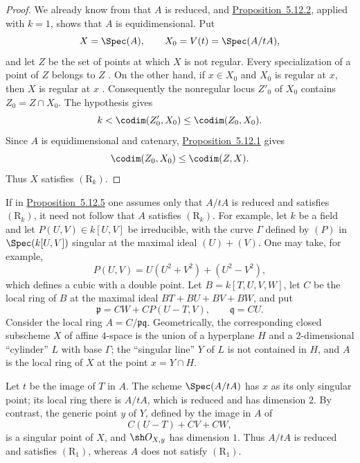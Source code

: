 \begin{proof}
We already know from  that $A$ is reduced, and
{\hyperlink{ega4.c04.prop.5-12-2}{Proposition~5.12.2}}, applied with $k=1$, shows that $A$ is
equidimensional.  Put
\[
  X=\Spec(A),\qquad X_0=V(t)=\Spec(A/tA),
\]
and let $Z$ be the set of points at which $X$ is not regular.
Every specialization of a point of $Z$ belongs to $Z$
.  On the other hand, if $x\in X_0$ and $X_0$
is regular at $x$, then $X$ is regular at $x$
.  Consequently the nonregular locus $Z'_0$
of $X_0$ contains $Z_0=Z\cap X_0$.  The hypothesis gives
\[
  k<\codim(Z'_0,X_0)\leq\codim(Z_0,X_0).
\]
Since $A$ is equidimensional and catenary, {\hyperlink{ega4.c04.prop.5-12-1}{Proposition~5.12.1}}
gives
\[
  \codim(Z_0,X_0)\leq\codim(Z,X).
\]
Thus $X$ satisfies $(\mathrm R_k)$.
\end{proof}

\begin{remark}[5.12.6]
\label{IV.5.12.6}
If in {\hyperlink{ega4.c04.prop.5-12-5}{Proposition~5.12.5}} one assumes only that $A/tA$ is reduced
and satisfies $(\mathrm R_k)$, it need not follow that $A$
satisfies $(\mathrm R_k)$.  For example, let $k$ be a field and
let $P(U,V)\in k[U,V]$ be irreducible, with the curve $\Gamma$
defined by $(P)$ in $\Spec(k[U,V])$ singular at the maximal ideal
$(U)+(V)$.  One may take, for example,
\[
  P(U,V)=U(U^2+V^2)+(U^2-V^2),
\]
which defines a cubic with a double point.  Let
$B=k[T,U,V,W]$, let $C$ be the local ring of $B$ at the maximal
ideal $BT+BU+BV+BW$, and put
\[
  \mathfrak p=CW+CP(U-T,V),\qquad \mathfrak q=CU.
\]
Consider the local ring $A=C/\mathfrak p\mathfrak q$.
Geometrically, the corresponding closed subscheme $X$ of affine
$4$-space is the union of a hyperplane $H$ and a
$2$-dimensional ``cylinder'' $L$ with base $\Gamma$; the
``singular line'' $Y$ of $L$ is not contained in $H$, and $A$ is
the local ring of $X$ at the point $x=Y\cap H$.

Let $t$ be the image of $T$ in $A$.  The scheme
$\Spec(A/tA)$ has $x$ as its only singular point; its local ring
there is $A/tA$, which is reduced and has dimension $2$.  By
contrast, the generic point $y$ of $Y$, defined by the image in
$A$ of
\[
  C(U-T)+CV+CW,
\]
is a singular point of $X$, and $\sh O_{X,y}$ has dimension $1$.
Thus $A/tA$ is reduced and satisfies $(\mathrm R_1)$, whereas
$A$ does not satisfy $(\mathrm R_1)$.
\end{remark}


